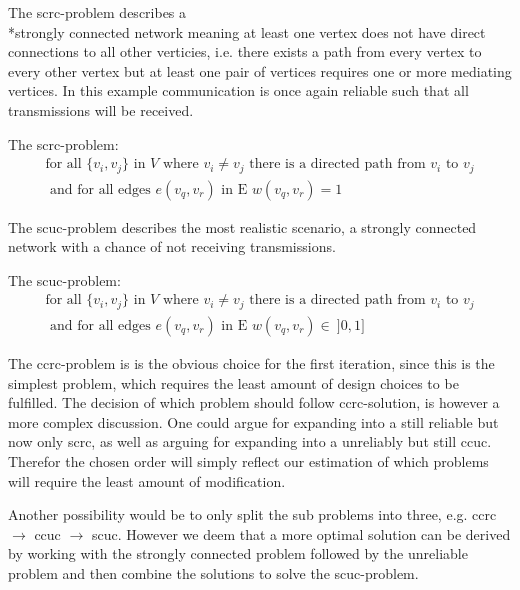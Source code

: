 \noindent The \gls{scrc}-problem describes a \\*strongly connected network meaning at least one vertex does not have direct connections to all other verticies, i.e. there exists a path from every vertex to every other vertex but at least one pair of vertices requires one or more mediating vertices. 
In this example communication is once again reliable such that all transmissions will be received. 

\begin{definition}
	The \acrshort{scrc}-problem:
	\begin{align*}
		\text{for all } \{v_i, v_j\} \text{ in } V \text{ where } v_i \neq v_j \text{ there is a directed path from } v_i \text{ to } v_j\\
		\text{ and for all edges } e(v_{q}, v_{r}) \text{ in E } w(v_{q}, v_{r}) = 1
	\end{align*}
\end{definition}

\noindent The \gls{scuc}-problem describes the most realistic scenario, a strongly connected network with a chance of not receiving transmissions. 

\begin{definition}\label{SCUC}
	The \acrshort{scuc}-problem:
	\begin{align*}
		\text{for all } \{v_i, v_j\} \text{ in } V \text{ where } v_i \neq v_j \text{ there is a directed path from } v_i \text{ to } v_j\\
		\text{ and for all edges } e(v_{q}, v_{r}) \text{ in E } w(v_{q}, v_{r}) \in\ ]0,1]
	\end{align*}
\end{definition}

\bigskip 
\noindent
The \gls{ccrc}-problem is is the obvious choice for the first iteration, since this is the simplest problem, which requires the least amount of design choices to be fulfilled.
The decision of which problem should follow \gls{ccrc}-solution, is however a more complex discussion.
One could argue for expanding into a still reliable but now only \acrlong{scrc}, as well as arguing for expanding into a unreliably but still \acrlong{ccuc}.
Therefor the chosen order will simply reflect our estimation of which problems will require the least amount of modification.

Another possibility would be to only split the sub problems into three, e.g. \gls{ccrc} $\rightarrow$ \gls{ccuc} $\rightarrow$ \gls{scuc}.
However we deem that a more optimal solution can be derived by working with the strongly connected problem followed by the unreliable problem and then combine the solutions to solve the \gls{scuc}-problem.

